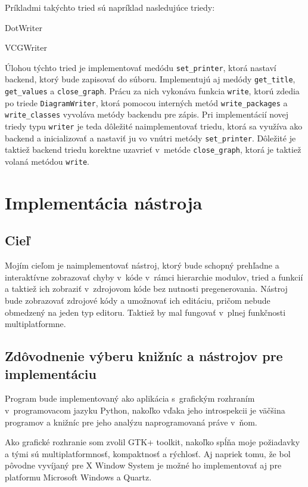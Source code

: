 \documentclass[11pt,oneside,final]{fithesis2}
\begin{document}
			Príkladmi takýchto tried sú napríklad nasledujúce triedy:
			    \begin{list}{•}{}
					\item DotWriter
					\item VCGWriter
    			\end{list}
    			
    	Úlohou týchto tried je implementovať medódu \texttt{set\_printer}, ktorá nastaví backend, ktorý bude zapisovať do súboru.
    	Implementujú aj medódy \texttt{get\_title},  \texttt{get\_values} a \texttt{close\_graph}.
    	Prácu za nich vykonáva funkcia \texttt{write}, ktorú zdedia po triede \texttt{DiagramWriter}, ktorá pomocou interných metód \texttt{write\_packages} a \texttt{write\_classes} vyvoláva metódy backendu pre zápis. Pri implementácií novej triedy typu \texttt{writer} je teda dôležité naimplementovať triedu, ktorá sa využíva ako backend a inicializovať a nastaviť ju vo vnútri metódy \texttt{set\_printer}.
    	Dôležité je taktiež backend triedu korektne uzavrieť v~metóde \texttt{close\_graph}, ktorá je taktiež volaná metódou \texttt{write}.
 
\chapter{Implementácia nástroja}
	\section{Cieľ}
	
	Mojím cieľom je naimplementovať nástroj, ktorý bude schopný prehľadne a interaktívne zobrazovať chyby v~kóde v~rámci hierarchie modulov, tried a funkcií a taktiež ich zobraziť v~zdrojovom kóde bez nutnosti pregenerovania. Nástroj bude zobrazovať zdrojové kódy a umožnovať ich editáciu, pričom nebude obmedzený na jeden typ editoru. Taktiež by mal fungovať v~plnej funkčnosti multiplatformne.
	
	\section{Zdôvodnenie výberu knižníc a nástrojov pre implementáciu}
		Program bude implementovaný ako aplikácia s~grafickým rozhraním v~programovacom jazyku Python, nakoľko vďaka jeho introspekcii je väčšina programov a knižníc pre jeho analýzu naprogramovaná práve v~ňom.
		
		Ako grafické rozhranie som zvolil GTK+ toolkit, nakoľko spĺňa moje požiadavky a tými sú multiplatformnosť, kompaktnosť a rýchlosť. Aj napriek tomu, že bol pôvodne vyvíjaný pre X Window System je možné ho implementovať aj pre platformu Microsoft Windows a Quartz.
		
\end{document}
